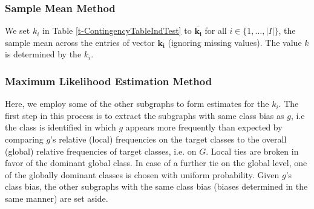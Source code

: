 \documentclass{article}
\begin{document}

\subsubsection{Sample Mean Method}
\label{ss:simple-mean}

We set $k_i$ in Table \ref{t-ContingencyTableIndTest} to
$\overline{\mathbf{k_i}}$ for all $i \in \{1,\ldots,|I|\}$, the sample mean
across the entries of vector $\mathbf{k_i}$ (ignoring missing values). The
value $k$ is determined by the $k_i$.

\subsubsection{Maximum Likelihood Estimation Method}
\label{ss:MLE}
Here, we employ some of the other subgraphs to form estimates for the $k_i$.
The first step in this process is to extract the subgraphs with same class bias
as $g$, i.e the class is identified in which $g$ appears more frequently than
expected by comparing $g$'s relative (local) frequencies on the target classes
to the overall (global) relative frequencies of target classes, i.e. on $G$.
Local ties are broken in favor of the dominant global
class. In case of a further tie on the global level, one of the globally
dominant classes is chosen with uniform probability. Given $g$'s class bias,
the other subgraphs with the same class bias (biases determined in the same
manner) are set aside.
\end{document}
